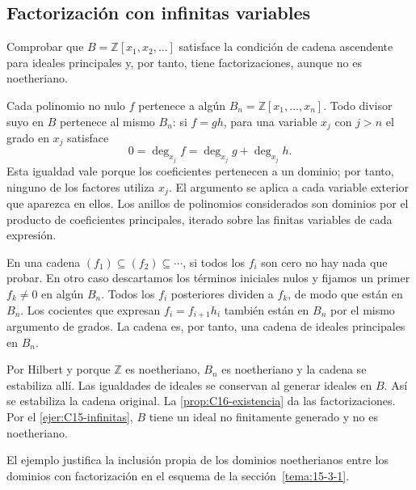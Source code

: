\subsection{Factorización con infinitas variables}\label{tema:16-1-2b}
\begin{ejer}\label{ejer:C16-infinitas}
Comprobar que $B=\mathbb Z[x_1,x_2,\ldots]$ satisface la condición de cadena ascendente para ideales principales y, por tanto, tiene factorizaciones, aunque no es noetheriano.
\end{ejer}
\begin{sol}
Cada polinomio no nulo $f$ pertenece a algún $B_n=\mathbb Z[x_1,\ldots,x_n]$. Todo divisor suyo en $B$ pertenece al mismo $B_n$: si $f=gh$, para una variable $x_j$ con $j>n$ el grado en $x_j$ satisface
\[
0=\deg_{x_j}f=\deg_{x_j}g+\deg_{x_j}h.
\]
Esta igualdad vale porque los coeficientes pertenecen a un dominio; por tanto, ninguno de los factores utiliza $x_j$. El argumento se aplica a cada variable exterior que aparezca en ellos. Los anillos de polinomios considerados son dominios por el producto de coeficientes principales, iterado sobre las finitas variables de cada expresión.

En una cadena $(f_1)\subseteq(f_2)\subseteq\cdots$, si todos los $f_i$ son cero no hay nada que probar. En otro caso descartamos los términos iniciales nulos y fijamos un primer $f_k\ne0$ en algún $B_n$. Todos los $f_i$ posteriores dividen a $f_k$, de modo que están en $B_n$. Los cocientes que expresan $f_i=f_{i+1}h_i$ también están en $B_n$ por el mismo argumento de grados. La cadena es, por tanto, una cadena de ideales principales en $B_n$.

Por Hilbert y porque $\mathbb Z$ es noetheriano, $B_n$ es noetheriano y la cadena se estabiliza allí. Las igualdades de ideales se conservan al generar ideales en $B$. Así se estabiliza la cadena original. La \cref{prop:C16-existencia} da las factorizaciones. Por el \cref{ejer:C15-infinitas}, $B$ tiene un ideal no finitamente generado y no es noetheriano.
\end{sol}
El ejemplo justifica la inclusión propia de los dominios noetherianos entre los dominios con factorización en el esquema de la sección~\ref{tema:15-3-1}.

